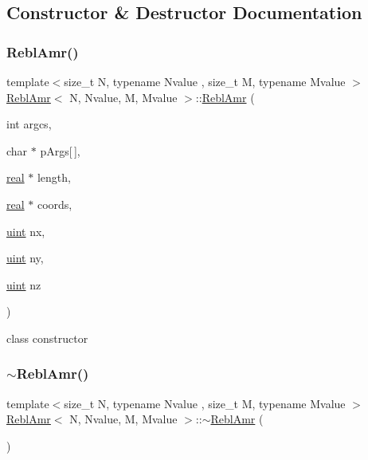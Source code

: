 \subsection{Constructor \& Destructor Documentation}
\mbox{\label{classReblAmr_a488d8ddc17e846da861a675599542106}} 
\subsubsection{\texorpdfstring{Rebl\+Amr()}{ReblAmr()}}
{\footnotesize\ttfamily template$<$size\+\_\+t N, typename Nvalue , size\+\_\+t M, typename Mvalue $>$ \\
\mbox{\hyperlink{classReblAmr}{Rebl\+Amr}}$<$ N, Nvalue, M, Mvalue $>$\+::\mbox{\hyperlink{classReblAmr}{Rebl\+Amr}} (\begin{DoxyParamCaption}\item[{int}]{argcs,  }\item[{char $\ast$}]{p\+Args\mbox{[}$\,$\mbox{]},  }\item[{\mbox{\hyperlink{definitions_8h_aedc0ad84d1e764530814f57ad931d02a}{real}} $\ast$}]{length,  }\item[{\mbox{\hyperlink{definitions_8h_aedc0ad84d1e764530814f57ad931d02a}{real}} $\ast$}]{coords,  }\item[{\mbox{\hyperlink{definitions_8h_a69aa29b598b851b0640aa225a9e5d61d}{uint}}}]{nx,  }\item[{\mbox{\hyperlink{definitions_8h_a69aa29b598b851b0640aa225a9e5d61d}{uint}}}]{ny,  }\item[{\mbox{\hyperlink{definitions_8h_a69aa29b598b851b0640aa225a9e5d61d}{uint}}}]{nz }\end{DoxyParamCaption})}

class constructor \mbox{\label{classReblAmr_af52059b5251847e324784367498930a7}} 
\subsubsection{\texorpdfstring{$\sim$\+Rebl\+Amr()}{~ReblAmr()}}
{\footnotesize\ttfamily template$<$size\+\_\+t N, typename Nvalue , size\+\_\+t M, typename Mvalue $>$ \\
\mbox{\hyperlink{classReblAmr}{Rebl\+Amr}}$<$ N, Nvalue, M, Mvalue $>$\+::$\sim$\mbox{\hyperlink{classReblAmr}{Rebl\+Amr}} (\begin{DoxyParamCaption}{ }\end{DoxyParamCaption})\hspace{0.3cm}{\ttfamily [inline]}}

